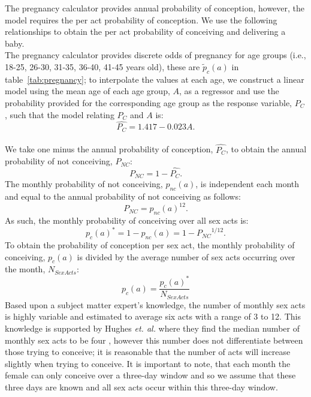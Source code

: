 \documentclass[11pt]{nih_mod}
\begin{document}
The pregnancy calculator provides annual probability of conception, however, the model requires the per act probability of conception.  We use the following relationships to obtain the per act probability of conceiving and delivering a baby.  
\\
The pregnancy calculator provides discrete odds of pregnancy for age groups (i.e., 18-25, 26-30, 31-35, 36-40, 41-45 years old), these are ${\tilde{p}_c(a)}$ in  table~\ref{tab:pregnancy}; to interpolate the values at each age, we construct a linear model using the mean age of each age group, $A$, as a regressor and use the probability provided for the corresponding age group as the response variable, $P_C$, such that the model relating $P_C$ and $A$ is:
\begin{equation}
	\hat{P_C}= 1.417 - 0.023A.
\end{equation}
\\We take one minus the annual probability of conception, $\hat{P_C}$, to obtain the annual probability of not conceiving, $P_{NC}$: 
\begin{equation}
	P_{NC} =  1 - \hat{P_C} .
\end{equation}
The monthly probability of not conceiving, $p_{nc}(a)$,  is independent each month and equal to the annual probability of not conceiving as follows:
\begin{equation}
	P_{NC} =  p_{nc}(a)^{12} .
\end{equation}
As such, the monthly probability of conceiving over all sex acts is:
\begin{equation}
	p_c(a)^* = 1 - p_{nc}(a) = 1 - {P_{NC}}^{1/12} . 
\end{equation}
To obtain the probability of conception per sex act, the monthly probability of conceiving, $p_c(a)$ is divided by the average number of sex acts occurring over the month, $N_{SexActs}$:  
\begin{equation}
	p_c(a) = \frac{p_c(a)^*}{N_{SexActs}}
\end{equation}
Based upon a subject matter expert's knowledge, the number of monthly sex acts is highly variable and estimated to average six acts with a range of 3 to 12.  This knowledge is supported by Hughes {\it et. al.} where they find the median number of monthly sex acts to be four \cite{Hughes2012}, however this number does not differentiate between those trying to conceive; it is reasonable that the number of acts will increase slightly when trying to conceive. It is important to note, that each month the female can only conceive over a three-day window and so we assume that these three days are known and all sex acts occur within this three-day window.
\end{document}
